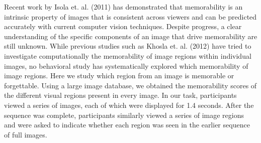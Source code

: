 Recent work by Isola et. al. (2011) has demonstrated that memorability is an intrinsic property of images that is consistent across viewers and can be predicted accurately with current computer vision techniques. Despite progress, a clear understanding of the specific components of an image that drive memorability are still unknown. While previous studies such as Khosla et. al. (2012) have tried to investigate computationally the memorability of image regions within individual images, no behavioral study has systematically explored which memorability of image regions. Here we study which region from an image is memorable or forgettable. Using a large image database, we obtained the memorability scores of the different visual regions present in every image. In our task, participants viewed a series of images, each of which were displayed for 1.4 seconds. After the sequence was complete, participants similarly viewed a series of image regions and were asked to indicate whether each region was seen in the earlier sequence of full images. 